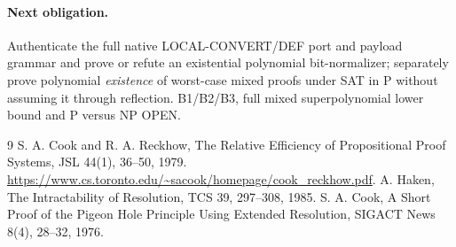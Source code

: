 \documentclass[11pt]{article}
\begin{document}
\paragraph{Next obligation.} Authenticate the full native LOCAL-CONVERT/DEF port and payload grammar and prove or refute an existential polynomial bit-normalizer; separately prove polynomial \emph{existence} of worst-case mixed proofs under SAT in P without assuming it through reflection. B1/B2/B3, full mixed superpolynomial lower bound and P versus NP OPEN.
\begin{thebibliography}{9}
 S. A. Cook and R. A. Reckhow, The Relative Efficiency of Propositional Proof Systems, JSL 44(1), 36--50, 1979. \url{https://www.cs.toronto.edu/~sacook/homepage/cook_reckhow.pdf}.
 A. Haken, The Intractability of Resolution, TCS 39, 297--308, 1985.
 S. A. Cook, A Short Proof of the Pigeon Hole Principle Using Extended Resolution, SIGACT News 8(4), 28--32, 1976.
\end{thebibliography}
\end{document}
